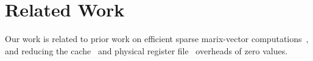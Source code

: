 \section{Related Work}
\label{sec:related}

Our work is related to prior work on efficient sparse marix-vector computations~\cite{Eisenstat82, IntelSparseMatrix, Carter99, Srinidhi12, Fowers13, Seshadri15}, and reducing the cache~\cite{Villa00, Zhang00, Dusser09, Islam09} and physical register file~\cite{Jourdan98, Balakrishnan03} overheads of zero values.  
